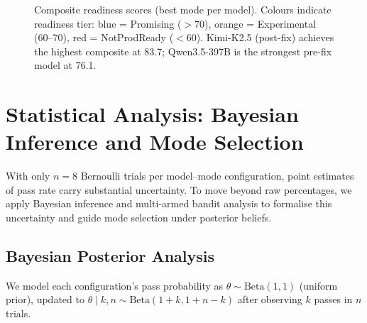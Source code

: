 \documentclass[11pt]{article}
\begin{document}
\begin{figure}[t]
\centering
{}
\caption{Composite readiness scores (best mode per model). Colours indicate readiness tier: blue = Promising ($>$70), orange = Experimental (60--70), red = NotProdReady ($<$60). Kimi-K2.5 (post-fix) achieves the highest composite at 83.7; Qwen3.5-397B is the strongest pre-fix model at 76.1.}
\label{fig:composite-bars}
\end{figure}

\section{Statistical Analysis: Bayesian Inference and Mode Selection}

With only $n{=}8$ Bernoulli trials per model--mode configuration, point estimates of pass rate carry substantial uncertainty. To move beyond raw percentages, we apply Bayesian inference and multi-armed bandit analysis to formalise this uncertainty and guide mode selection under posterior beliefs.

\subsection{Bayesian Posterior Analysis}

We model each configuration's pass probability as $\theta \sim \text{Beta}(1,1)$ (uniform prior), updated to $\theta \mid k,n \sim \text{Beta}(1{+}k, 1{+}n{-}k)$ after observing $k$ passes in $n$ trials.
\end{document}
